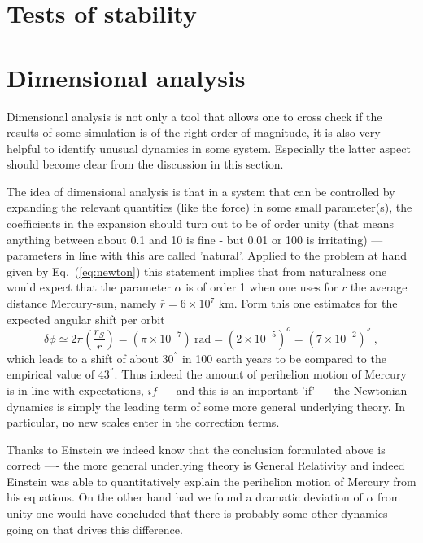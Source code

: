\documentclass[12pt]{iopart}
\begin{document}
\clearpage

\section{Tests of stability}\label{sec:stability}



\section{Dimensional analysis}\label{sec:analysis}

Dimensional analysis is not only a tool that allows one to cross check if the results of some simulation is
of the right order of magnitude, it is also very helpful to identify unusual dynamics in some system.
Especially the latter aspect should become clear from the discussion in this section.

The idea of dimensional analysis is that in a system that can be controlled by expanding the relevant quantities
(like the force) in some small parameter(s), the coefficients in the expansion should turn out to be of order unity (that
means anything between about 0.1 and 10 is fine - but 0.01 or 100 is irritating) --- parameters in line with this
are called 'natural'. Applied to the problem at hand
given by Eq.~(\ref{eq:newton}) this statement implies that from naturalness one would expect that 
the parameter $\alpha$ is of order 1 when one uses
for $r$ the average distance Mercury-sun, namely $\bar r=6\times 10^7$ km.
Form this one estimates for the expected angular shift per orbit
\begin{equation}
\delta \phi \simeq 2\pi\left(\frac{r_S}{\bar r}\right) = (\pi \times 10^{-7}) \ \mbox{rad} = (2\times 10^{-5})^o = (7\times 10^{-2}) ^{''} \ ,
\end{equation}
which leads to a shift of  about $30^{''}$ in 100 earth years to be compared to the empirical value of $43^{''}$.
 Thus indeed the
amount of perihelion motion of Mercury is in line with expectations, $if$ --- and this is an important 'if' ---
the Newtonian dynamics is simply the leading term of some more general underlying theory. In particular,
no new scales enter in the correction terms.

Thanks to Einstein we indeed know that the conclusion formulated above is correct ---- the more general underlying
theory is General Relativity and indeed Einstein was able to quantitatively explain the perihelion motion of Mercury
from his equations. 
On the other hand had we found a dramatic deviation of $\alpha$ from unity one would have concluded that 
there is probably some other dynamics going on that drives this difference.
\end{document}
